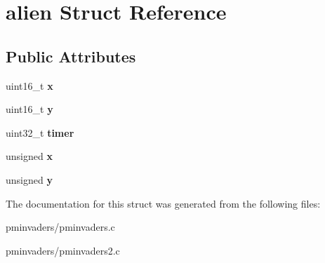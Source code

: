 \hypertarget{structalien}{}\section{alien Struct Reference}
\label{structalien}
\subsection*{Public Attributes}
\begin{DoxyCompactItemize}
\item 
\mbox{\label{structalien_ad1a54b0957f6532b94fe028803546b18}} 
uint16\+\_\+t {\bfseries x}
\item 
\mbox{\label{structalien_a4df242edfb1ab274c812a78f76e2836e}} 
uint16\+\_\+t {\bfseries y}
\item 
\mbox{\label{structalien_a72f3950d108ca416266ef6b109cd189a}} 
uint32\+\_\+t {\bfseries timer}
\item 
\mbox{\label{structalien_a36d07156cb4c40f731e58ca2bd38b282}} 
unsigned {\bfseries x}
\item 
\mbox{\label{structalien_a81d3961b661d01b590151a3e9eb00b08}} 
unsigned {\bfseries y}
\end{DoxyCompactItemize}


The documentation for this struct was generated from the following files\+:\begin{DoxyCompactItemize}
\item 
pminvaders/pminvaders.\+c\item 
pminvaders/pminvaders2.\+c\end{DoxyCompactItemize}

